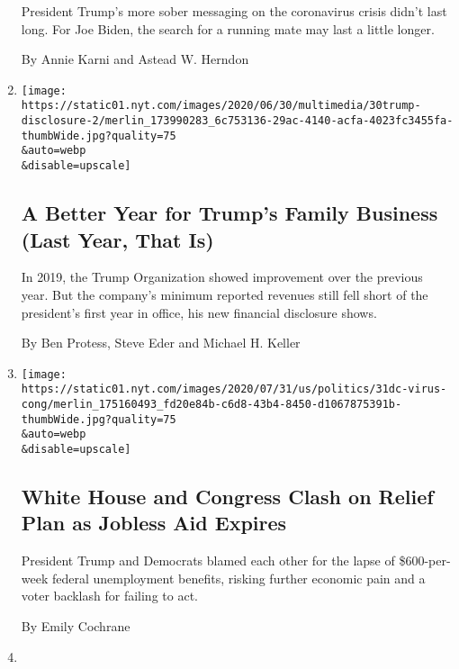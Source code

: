 \begin{enumerate}
  President Trump's more sober messaging on the coronavirus crisis
  didn't last long. For Joe Biden, the search for a running mate may
  last a little longer.

  By Annie Karni and Astead W. Herndon
\item
  \href{/2020/07/31/business/trump-financial-disclosure.html}{}

  \texttt{[image: https://static01.nyt.com/images/2020/06/30/multimedia/30trump-disclosure-2/merlin\_173990283\_6c753136-29ac-4140-acfa-4023fc3455fa-thumbWide.jpg?quality=75\\\&auto=webp\\\&disable=upscale]}

  \hypertarget{a-better-year-for-trumps-family-business-last-year-that-is}{%
  \subsection{A Better Year for Trump's Family Business (Last Year, That
  Is)}\label{a-better-year-for-trumps-family-business-last-year-that-is}}

  In 2019, the Trump Organization showed improvement over the previous
  year. But the company's minimum reported revenues still fell short of
  the president's first year in office, his new financial disclosure
  shows.

  By Ben Protess, Steve Eder and Michael H. Keller
\item
  \href{/2020/07/31/us/politics/white-house-congress-relief-plan-jobless-aid.html}{}

  \texttt{[image: https://static01.nyt.com/images/2020/07/31/us/politics/31dc-virus-cong/merlin\_175160493\_fd20e84b-c6d8-43b4-8450-d1067875391b-thumbWide.jpg?quality=75\\\&auto=webp\\\&disable=upscale]}

  \hypertarget{white-house-and-congress-clash-on-relief-plan-as-jobless-aid-expires}{%
  \subsection{White House and Congress Clash on Relief Plan as Jobless
  Aid
  Expires}\label{white-house-and-congress-clash-on-relief-plan-as-jobless-aid-expires}}

  President Trump and Democrats blamed each other for the lapse of
  \$600-per-week federal unemployment benefits, risking further economic
  pain and a voter backlash for failing to act.

  By Emily Cochrane
\item
  \href{/2020/07/31/us/politics/trump-coronavirus-testing.html}{}


\end{enumerate}
